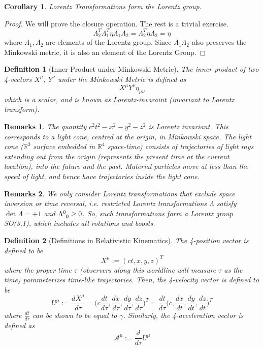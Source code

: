\documentclass[a4paper]{article}
\newtheorem{remarks}{Remarks}[section]
\theoremstyle{new}
\newtheorem{defi}{Definition}[section]
\newtheorem{cor}{Corollary}[section]
\begin{document}
\begin{cor}
Lorentz Transformations form the Lorentz group.
\end{cor}
\begin{proof}
We will prove the closure operation. The rest is a trivial exercise.
$$\Lambda_2^T\Lambda_1^T\eta\Lambda_1\Lambda_2=\Lambda_2^T\eta\Lambda_2=\eta$$
where $\Lambda_1,\Lambda_2$ are elements of the Lorentz group. Since $\Lambda_1\Lambda_2$ also preserves the Minkowski metric, it is also an element of the Lorentz Group.
\end{proof}
\begin{defi}[Inner Product under Minkowski Metric]
The inner product of two 4-vectors $X^\mu$, $Y^\nu$ under the Minkowski Metric is defined as
$$X^\mu Y^\nu\eta_{\mu\nu}$$
which is a scalar, and is known as Lorentz-invaraint (invariant to Lorentz transform).
\end{defi}
\begin{remarks}
The quantity $c^2t^2-x^2-y^2-z^2$ is Lorentz invariant. This corresponds to a light cone, centred at the origin, in Minkowski space. The light cone ($\mathbb{R}^3$ surface embedded in $\mathbb{R}^4$ space-time) consists of trajectories of light rays extending out from the origin (represents the present time at the current location), into the future and the past. Material particles move at less than the speed of light, and hence have trajectories inside the light cone.
\end{remarks}
\begin{remarks}
We only consider Lorentz transformations that exclude space inversion or time reversal, i.e. restricted Lorentz transformations $\Lambda$ satisfy $\det\Lambda=+1$ and $\tensor*{\Lambda}{*_{}^{0}_{0}}\geq0$. So, such transformations form a Lorentz group SO(3,1), which includes all rotations and boosts. 
\end{remarks}
\begin{defi}[Definitions in Relativistic Kinematics]
The 4-position vector is defined to be
$$X^\mu:=(ct,x,y,z)^T$$
where the proper time $\tau$ (observers along this worldline will measure $\tau$ as the time) parameterizes time-like trajectories. Then, the 4-velocity vector is defined to be
$$U^\mu:=\frac{dX^\mu}{d\tau}=\bigg(c\frac{dt}{d\tau},\frac{dx}{d\tau},\frac{dy}{d\tau},\frac{dz}{d\tau}\bigg)^T=\frac{dt}{d\tau}\bigg(c,\frac{dx}{dt},\frac{dy}{dt},\frac{dz}{dt}\bigg)^T$$
where $\frac{dt}{d\tau}$ can be shown to be equal to $\gamma$. Similarly, the 4-acceleration vector is defined as
$$\mathcal{A}^\mu:=\frac{d}{d\tau}U^\mu$$
\end{defi}
\end{document}
